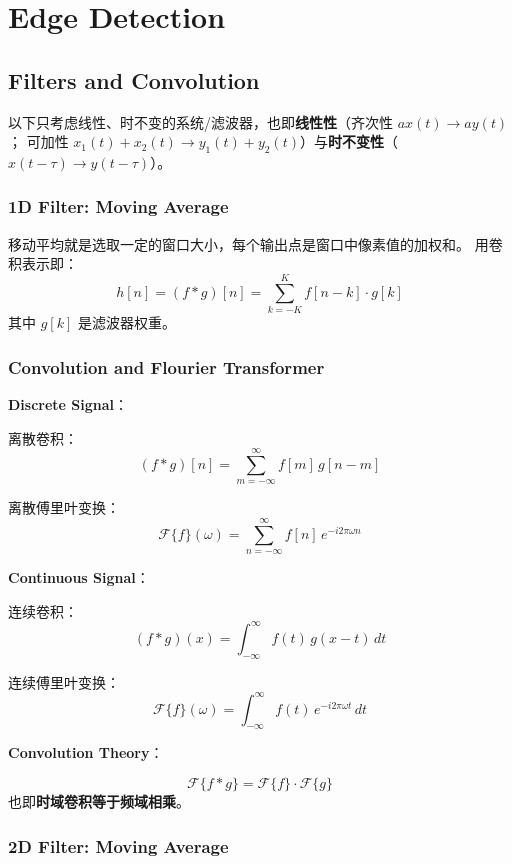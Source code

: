 \section{Edge Detection}\label{edge-detection}

\subsection{Filters and Convolution}\label{filters-and-convolution}

以下只考虑线性、时不变的系统/滤波器，也即\textbf{线性性}（齐次性 $a x(t)\to a y(t)$；
可加性 $x_1(t)+x_2(t)\to y_1(t)+y_2(t)$）与\textbf{时不变性}（$x(t-\tau)\to y(t-\tau)$）。

\subsubsection{1D Filter: Moving Average}\label{d-filter-moving-average}

移动平均就是选取一定的窗口大小，每个输出点是窗口中像素值的加权和。
用卷积表示即： \[
  h[n] = (f * g)[n] = \sum_{k=-K}^{K} f[n-k] \cdot g[k]
\] 其中 \(g[k]\) 是滤波器权重。

\subsubsection{Convolution and Flourier
  Transformer}\label{convolution-and-flourier-transformer}

\textbf{Discrete Signal}：

离散卷积： \[
  (f * g)[n] = \sum_{m=-\infty}^{\infty} f[m]\, g[n-m]
\]

离散傅里叶变换： \[
  \mathcal{F}\{f\}(\omega) = \sum_{n=-\infty}^{\infty} f[n]\, e^{-i2\pi\omega n}
\]

\textbf{Continuous Signal}：

连续卷积： \[
  (f * g)(x) = \int_{-\infty}^{\infty} f(t)\, g(x   - t)\, dt
\]

连续傅里叶变换： \[
  \mathcal{F}\{f\}(\omega) = \int_{-\infty}^\infty f(t)\, e^{-i2\pi \omega t}\, dt
\]

\textbf{Convolution Theory}：

\[
  \mathcal{F}\{f * g\} = \mathcal{F}\{f\} \cdot \mathcal{F}\{g\}
\]
也即\textbf{时域卷积等于频域相乘}。

\subsubsection{2D Filter: Moving
  Average}\label{d-filter-moving-average-1}

